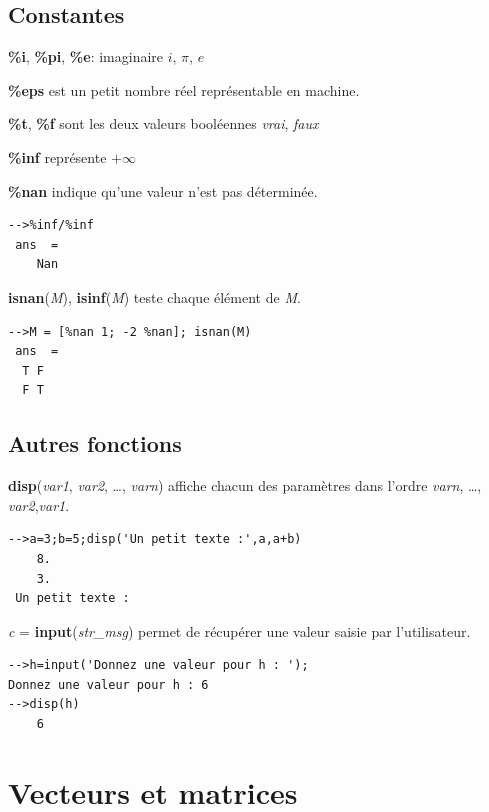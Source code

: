 \documentclass{article}
\begin{document}
\begin{multicols}{3}
\subsection*{Constantes}
\begin{description}
\item{\textbf{\%i}, \textbf{\%pi}, \textbf{\%e}}:  imaginaire $i$, $\pi$, $e$
\item{\textbf{\%eps}} est un petit nombre réel représentable en machine.
\item {\textbf{\%t}, \textbf{\%f}} sont les deux valeurs booléennes \textit{vrai}, \textit{faux}
\item {\textbf{\%inf}} représente $+\infty$ 
\item {\textbf{\%nan}}  indique qu'une valeur n'est pas déterminée.
\begin{verbatim}
-->%inf/%inf
 ans  =
    Nan
\end{verbatim}
\item {\textbf{isnan}(\textit{M}), \textbf{isinf}(\textit{M})} teste chaque élément de \textit{M}.
\begin{verbatim} 
-->M = [%nan 1; -2 %nan]; isnan(M)
 ans  =
  T F  
  F T 
  \end{verbatim}
\end{description}
\subsection*{Autres fonctions}
\begin{description}
\item{\textbf{disp}(\textit{var1}, \textit{var2}, \ldots, \textit{varn})} affiche chacun des paramètres dans l'ordre \textit{varn}, \ldots, \textit{var2},\textit{var1}.
\begin{verbatim}
-->a=3;b=5;disp('Un petit texte :',a,a+b)
    8.  
    3.  
 Un petit texte : 
\end{verbatim}
\item{\textit{c} = \textbf{input}(\textit{str\_msg})} permet de récupérer une valeur saisie par l'utilisateur.
\begin{verbatim}
-->h=input('Donnez une valeur pour h : ');
Donnez une valeur pour h : 6
-->disp(h)
    6
\end{verbatim}
\end{description}

\section*{Vecteurs et matrices}

\end{multicols}
\end{document}
